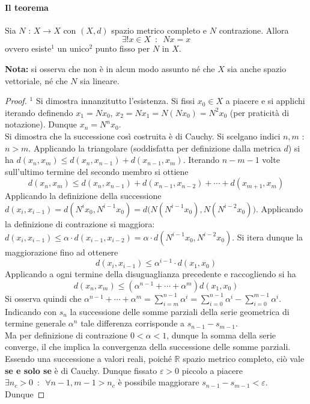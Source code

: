 \documentclass[10pt]{article}
\theoremstyle{plain}
\begin{document}
\paragraph{Il teorema}
\begin{ther}
Sia $N$ : $X \rightarrow X$ con $(X,d)$ spazio metrico completo e $N$ contrazione. Allora
\[\exists! x \in X \enspace : \enspace N x = x\]
ovvero esiste$^1$ un unico$^2$ punto fisso per $N$ in $X$.
\end{ther}
\textbf{Nota:} si osserva che non è in alcun modo assunto né che $X$ sia anche spazio vettoriale, né che $N$ sia lineare.
\begin{proof}
$^1$ Si dimostra innanzitutto l'esistenza. Si fissi $x_0 \in X$ a piacere e si applichi iterando definendo $x_1 = N x_0$, $x_2 = N x_1 = N (N x_0) = N^2 x_0$ (per praticità di notazione). Dunque $x_n = N^n x_0$. 
\\Si dimostra che la successione così costruita è di Cauchy. Si scelgano indici $n,m$ : $n > m$. Applicando la triangolare (soddisfatta per definizione dalla metrica $d$) si ha $d(x_n, x_m) \leq d(x_n, x_{n-1}) + d(x_{n-1}, x_m)$. Iterando $n-m-1$ volte sull'ultimo termine del secondo membro si ottiene
\[d(x_n, x_m) \leq d(x_n, x_{n-1}) + d(x_{n-1}, x_{n-2}) + \cdots + d(x_{m+1}, x_m)\]
Applicando la definizione della successione $\displaystyle d(x_i, x_{i-1}) = d(N^i x_0, N^{i-1} x_0) = d\big( N (N^{i-1} x_0), N (N^{i-2} x_0)\big)$. Applicando la definizione di contrazione si maggiora: $\displaystyle d(x_i, x_{i-1}) \leq \alpha \cdot d(x_{i-1}, x_{i-2}) = \alpha \cdot d(N^{i-1} x_0, N^{i-2} x_0)$. Si itera dunque la maggiorazione fino ad ottenere 
\[d(x_i, x_{i-1}) \leq \alpha^{i-1} \cdot d(x_1, x_0)\]
Applicando a ogni termine della disuguaglianza precedente e raccogliendo si ha
\[d(x_n, x_m) \leq (\alpha^{n-1} + \cdots + \alpha^m) d(x_1, x_0)\]
Si osserva quindi che $\displaystyle \alpha^{n-1} + \cdots + \alpha^m = \sum\limits_{i=m}^{n-1} \alpha^i = \sum\limits_{i=0}^{n-1} \alpha^i - \sum\limits_{i=0}^{m-1} \alpha^i$. Indicando con $s_n$ la successione delle somme parziali della serie geometrica di termine generale $\alpha^n$ tale differenza corrisponde a $s_{n-1} - s_{m-1}$.
\\Ma per definizione di contrazione $0 < \alpha < 1$, dunque la somma della serie converge, il che implica la convergenza della successione delle somme parziali. Essendo una successione a valori reali, poiché $\mathbb{R}$ spazio metrico completo, ciò vale \textbf{se e solo se} è di Cauchy. Dunque fissato $\varepsilon > 0$ piccolo a piacere $\exists n_c > 0 \enspace : \enspace \forall n-1, m-1 > n_c$ è possibile maggiorare $s_{n-1} - s_{m-1} < \varepsilon$. Dunque 

\end{proof}
\end{document}
